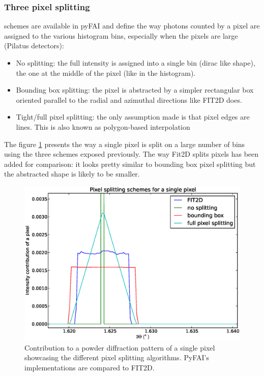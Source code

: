 \documentclass[preprint]{iucr}
\begin{document}
\subsubsection{Three pixel splitting} schemes are available in pyFAI and define
the way photons counted by a pixel are assigned to the various histogram bins,
especially when the pixels are large (Pilatus detectors):
\begin{itemize}
\item No splitting: the full intensity is assigned into a single bin (dirac
like shape), the one at the middle of the pixel (like in the histogram).
\item Bounding box splitting: the pixel is abstracted by a simpler rectangular box
oriented parallel to the radial and azimuthal directions like FIT2D does.
\item
Tight/full pixel splitting: the only assumption made is that pixel
edges are lines. This is also known as polygon-based interpolation
\cite{stefanvdw}
\end{itemize}
The figure \ref{split} presents the way a single pixel is split on a
large number of bins using the three schemes exposed previously. The way Fit2D
splits pixels has been added for comparison: it looks pretty similar to bounding
box pixel splitting but the abstracted shape is likely to be smaller.

\begin{figure}
\label{split}
\begin{center}
\includegraphics[width=15cm]{splitpixel.eps}
\caption{Contribution to a powder diffraction pattern of a single pixel showcasing the
different pixel splitting algorithms. PyFAI's implementations are
compared to FIT2D.}
\end{center}
\end{figure}
\end{document}

